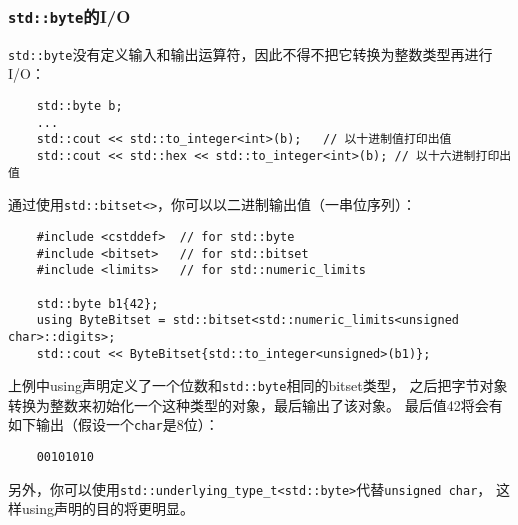 \subsubsection{\texttt{std::byte}的I/O}\label{ch18.2.2.2}
\texttt{std::byte}没有定义输入和输出运算符，因此不得不把它转换为整数类型再进行I/O：
\begin{lstlisting}
    std::byte b;
    ...
    std::cout << std::to_integer<int>(b);   // 以十进制值打印出值
    std::cout << std::hex << std::to_integer<int>(b); // 以十六进制打印出值
\end{lstlisting}
通过使用\texttt{std::bitset<>}，你可以以二进制输出值（一串位序列）：
\begin{lstlisting}
    #include <cstddef>  // for std::byte
    #include <bitset>   // for std::bitset
    #include <limits>   // for std::numeric_limits

    std::byte b1{42};
    using ByteBitset = std::bitset<std::numeric_limits<unsigned char>::digits>;
    std::cout << ByteBitset{std::to_integer<unsigned>(b1)};
\end{lstlisting}
上例中using声明定义了一个位数和\texttt{std::byte}相同的bitset类型，
之后把字节对象转换为整数来初始化一个这种类型的对象，最后输出了该对象。
最后值42将会有如下输出（假设一个\texttt{char}是8位）：
\begin{lstlisting}
    00101010
\end{lstlisting}
另外，你可以使用\texttt{std::underlying\_type\_t<std::byte>}代替\texttt{unsigned char}，
这样using声明的目的将更明显。

